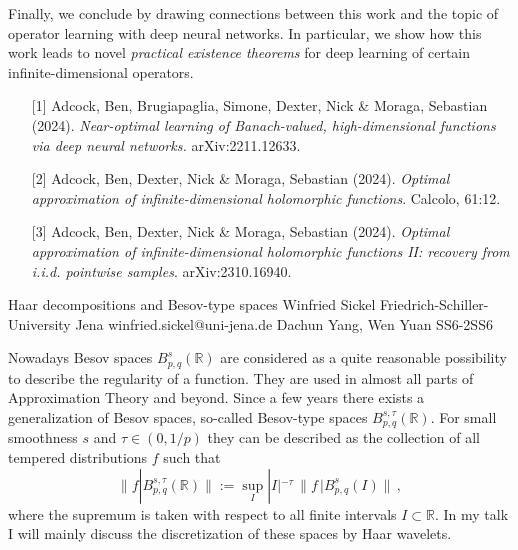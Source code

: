 \begin{talk}
Finally, we conclude by drawing connections between this work and the topic of operator learning with deep neural networks. In particular, we show how this work leads to novel \textit{practical existence theorems} for deep learning of certain infinite-dimensional operators.


\medskip

\begin{enumerate}
\item[{[1]}] Adcock, Ben, Brugiapaglia, Simone, Dexter, Nick \& Moraga, Sebastian (2024). 
{\it Near-optimal learning of Banach-valued, high-dimensional functions via deep neural networks.} arXiv:2211.12633.
	\item[{[2]}] Adcock, Ben, Dexter, Nick \& Moraga, Sebastian (2024). {\it Optimal approximation of infinite-dimensional holomorphic functions}. Calcolo, 61:12.
	\item[{[3]}] Adcock, Ben, Dexter, Nick \& Moraga, Sebastian (2024). {\it Optimal approximation of infinite-dimensional holomorphic functions II: recovery from i.i.d. pointwise samples}. arXiv:2310.16940.
\end{enumerate}

\end{talk}

\begin{talk}
  {Haar decompositions and Besov-type spaces}%
  {Winfried Sickel}%
  {Friedrich-Schiller-University Jena }%
  {winfried.sickel@uni-jena.de}%
  {Dachun Yang, Wen Yuan}%
{}{}{SS6-2}{SS6}

			
Nowadays Besov spaces $B^s_{p,q} (\mathbb{R})$ are considered as a quite reasonable possibility to describe the regularity of a function. They are used in almost all parts of Approximation Theory and beyond. 
Since a few years there exists a generalization of Besov spaces, so-called Besov-type spaces $B^{s,\tau}_{p,q} (\mathbb{R})$. 
For small smoothness $s$ and $\tau \in (0,1/p)$ they can be described as the collection of all tempered distributions 
$f$ such that
\[
\| f|B^{s,\tau}_{p,q} (\mathbb{R})\| := \sup_{I} |I|^{-\tau} \, \| f\, |B^{s}_{p,q} (I)\|\, , 
\]
where the supremum is taken with respect to all finite intervals $I \subset \mathbb{R}$.
In my talk I will mainly  discuss the discretization of these spaces by Haar wavelets.
 

\end{talk}

